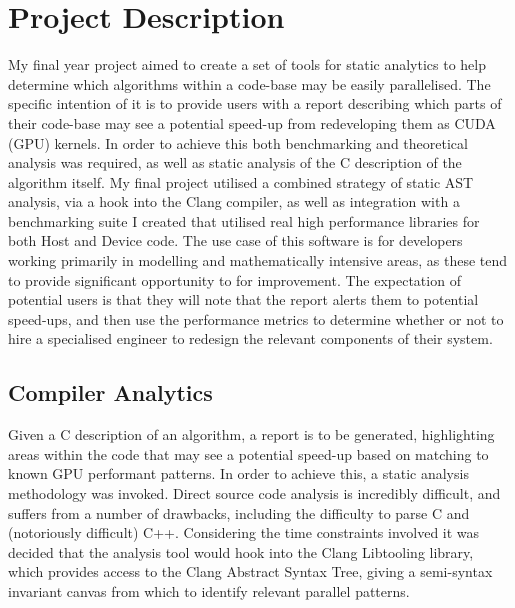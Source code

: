 
\section{Project Description} 
My final year project aimed to create a set of tools for static analytics to help determine which
algorithms within a code-base may be easily parallelised. The specific intention of it is to provide
users with a report describing which parts of their code-base may see a potential speed-up from
redeveloping them as CUDA (GPU)\cite{cuda} kernels. In order to achieve this both benchmarking and
theoretical analysis was required, as well as static analysis of the C description of the algorithm
itself. My final project utilised a combined strategy of static AST analysis, via a hook into the
Clang compiler, as well as integration with a benchmarking suite I created that utilised real high
performance libraries for both Host and Device code. The use case of this software is for developers
working primarily in modelling and mathematically intensive areas, as these tend to provide
significant opportunity to for improvement. The expectation of potential users is that they will
note that the report alerts them to potential speed-ups, and then use the performance metrics to
determine whether or not to hire a specialised engineer to redesign the relevant components of their
system.

\subsection{Compiler Analytics} 
Given a C description of an algorithm, a report is to be generated, highlighting areas within the
code that may see a potential speed-up based on matching to known GPU performant patterns. In order
to achieve this, a static analysis methodology was invoked. Direct source code analysis is
incredibly difficult, and suffers from a number of drawbacks, including the difficulty to parse C
and (notoriously difficult) C++. Considering the time constraints involved it was decided that the
analysis tool would hook into the Clang Libtooling library, which provides access to the Clang
Abstract Syntax Tree, giving a semi-syntax invariant canvas from which to identify relevant parallel
patterns.

